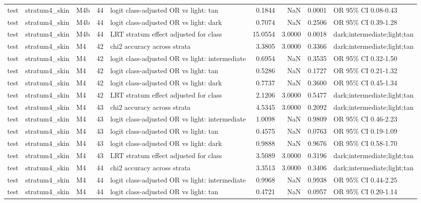 \begin{tabular}{lllrlrrrl}
test & stratum4\_skin & M4b & 44 & logit class-adjusted OR vs light: tan & 0.1844 & NaN & 0.0001 & OR 95\% CI 0.08-0.43 \\
test & stratum4\_skin & M4b & 44 & logit class-adjusted OR vs light: dark & 0.7074 & NaN & 0.2506 & OR 95\% CI 0.39-1.28 \\
test & stratum4\_skin & M4b & 44 & LRT stratum effect adjusted for class & 15.0554 & 3.0000 & 0.0018 & dark;intermediate;light;tan \\
test & stratum4\_skin & M4 & 42 & chi2 accuracy across strata & 3.3805 & 3.0000 & 0.3366 & dark;intermediate;light;tan \\
test & stratum4\_skin & M4 & 42 & logit class-adjusted OR vs light: intermediate & 0.6954 & NaN & 0.3535 & OR 95\% CI 0.32-1.50 \\
test & stratum4\_skin & M4 & 42 & logit class-adjusted OR vs light: tan & 0.5286 & NaN & 0.1727 & OR 95\% CI 0.21-1.32 \\
test & stratum4\_skin & M4 & 42 & logit class-adjusted OR vs light: dark & 0.7737 & NaN & 0.3600 & OR 95\% CI 0.45-1.34 \\
test & stratum4\_skin & M4 & 42 & LRT stratum effect adjusted for class & 2.1206 & 3.0000 & 0.5477 & dark;intermediate;light;tan \\
test & stratum4\_skin & M4 & 43 & chi2 accuracy across strata & 4.5345 & 3.0000 & 0.2092 & dark;intermediate;light;tan \\
test & stratum4\_skin & M4 & 43 & logit class-adjusted OR vs light: intermediate & 1.0098 & NaN & 0.9809 & OR 95\% CI 0.46-2.23 \\
test & stratum4\_skin & M4 & 43 & logit class-adjusted OR vs light: tan & 0.4575 & NaN & 0.0763 & OR 95\% CI 0.19-1.09 \\
test & stratum4\_skin & M4 & 43 & logit class-adjusted OR vs light: dark & 0.9888 & NaN & 0.9676 & OR 95\% CI 0.58-1.70 \\
test & stratum4\_skin & M4 & 43 & LRT stratum effect adjusted for class & 3.5089 & 3.0000 & 0.3196 & dark;intermediate;light;tan \\
test & stratum4\_skin & M4 & 44 & chi2 accuracy across strata & 3.3513 & 3.0000 & 0.3406 & dark;intermediate;light;tan \\
test & stratum4\_skin & M4 & 44 & logit class-adjusted OR vs light: intermediate & 0.9968 & NaN & 0.9938 & OR 95\% CI 0.44-2.25 \\
test & stratum4\_skin & M4 & 44 & logit class-adjusted OR vs light: tan & 0.4721 & NaN & 0.0957 & OR 95\% CI 0.20-1.14 \\

\end{tabular}
